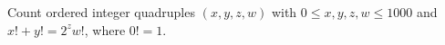 Count ordered integer quadruples $(x,y,z,w)$ with $0\le x,y,z,w\le1000$ and $x!+y!=2^z w!$, where $0!=1$.

